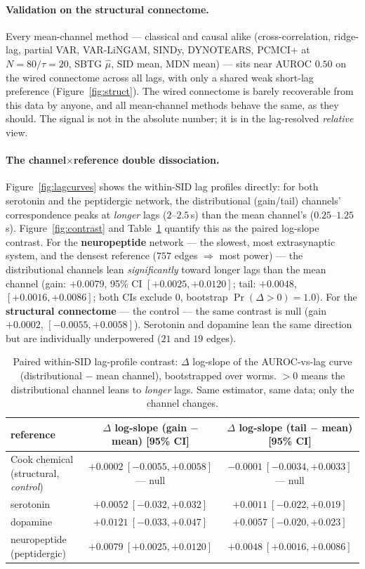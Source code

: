 \documentclass[11pt]{article}
\newcommand{\sigmark}[1]{\textcolor{sig}{\textbf{#1}}}
\begin{document}
\paragraph{Validation on the structural connectome.} Every mean-channel method --- classical and
causal alike (cross-correlation, ridge-lag, partial VAR, VAR-LiNGAM, SINDy, DYNOTEARS, PCMCI$+$ at
$N{=}80/\tau{=}20$, SBTG $\hat\mu$, SID mean, MDN mean) --- sits near AUROC $0.50$ on the wired
connectome across all lags, with only a shared weak short-lag preference (Figure~\ref{fig:struct}).
The wired connectome is barely recoverable from this data by anyone, and all mean-channel methods
behave the same, as they should. The signal is not in the absolute number; it is in the
lag-resolved \emph{relative} view.

\paragraph{The channel$\times$reference double dissociation.} Figure~\ref{fig:lagcurves} shows the
within-SID lag profiles directly: for both serotonin and the peptidergic network, the distributional
(gain/tail) channels' correspondence peaks at \emph{longer} lags ($2$--$2.5$\,s) than the mean
channel's ($0.25$--$1.25$\,s). Figure~\ref{fig:contrast} and Table~\ref{tab:contrast} quantify this
as the paired log-slope contrast. For the \textbf{neuropeptide} network --- the slowest, most
extrasynaptic system, and the densest reference ($757$ edges $\Rightarrow$ most power) --- the
distributional channels lean \emph{significantly} toward longer lags than the mean channel (gain:
$+0.0079$, 95\% CI $[+0.0025,+0.0120]$; tail: $+0.0048$, $[+0.0016,+0.0086]$; both CIs exclude $0$,
bootstrap $\Pr(\Delta>0)=1.0$). For the \textbf{structural connectome} --- the control --- the same
contrast is null (gain $+0.0002$, $[-0.0055,+0.0058]$). Serotonin and dopamine lean the same
direction but are individually underpowered ($21$ and $19$ edges).

\begin{table}[t]
\centering
\small
\caption{Paired within-SID lag-profile contrast: $\Delta$ log-slope of the AUROC-vs-lag curve
(distributional $-$ mean channel), bootstrapped over worms. $>0$ means the distributional channel
leans to \emph{longer} lags. Same estimator, same data; only the channel changes.}
\label{tab:contrast}
\begin{tabular}{lcc}
\toprule
reference & $\Delta$ log-slope (gain $-$ mean) [95\% CI] & $\Delta$ log-slope (tail $-$ mean) [95\% CI]\\
\midrule
Cook chemical (structural, \emph{control}) & $+0.0002\ [-0.0055,+0.0058]$ --- null & $-0.0001\ [-0.0034,+0.0033]$ --- null\\
serotonin      & $+0.0052\ [-0.032,+0.032]$ & $+0.0011\ [-0.022,+0.019]$\\
dopamine       & $+0.0121\ [-0.033,+0.047]$ & $+0.0057\ [-0.020,+0.023]$\\
neuropeptide (peptidergic) & \sigmark{$+0.0079\ [+0.0025,+0.0120]$} & \sigmark{$+0.0048\ [+0.0016,+0.0086]$}\\
\bottomrule
\end{tabular}
\end{table}
\end{document}

